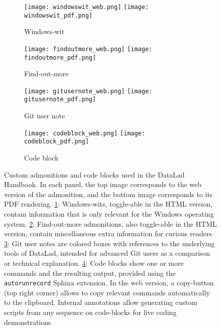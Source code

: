 \begin{figure}
	\hfill
	\begin{subfigure}{.44\textwidth}
	\texttt{[image: windowswit\_web.png]}
	\texttt{[image: windowswit\_pdf.png]}
	\caption{Windows-wit}
	\label{fig:handbook-windowswit}
	\end{subfigure}
	\begin{subfigure}{.55\textwidth}
		\texttt{[image: findoutmore\_web.png]}
		\texttt{[image: findoutmore\_pdf.png]}
		\caption{Find-out-more}
		\label{fig:handbook-findoutmore}
	\end{subfigure}
	\hfill
	\begin{subfigure}{.44\textwidth}
	\texttt{[image: gitusernote\_web.png]}
	\texttt{[image: gitusernote\_pdf.png]}
	\caption{Git user note}
	\label{fig:handbook-gitusernote}
	\end{subfigure}
	\hfill
	\begin{subfigure}{.55\textwidth}
	\texttt{[image: codeblock\_web.png]}
	\texttt{[image: codeblock\_pdf.png]}
	\caption{Code block}
	\label{fig:handbook-codeblock}
    \end{subfigure}
	\caption[Customization in the DataLad Handbook]{Custom admonitions and code blocks used in the DataLad Handbook. In each panel, the top image corresponds to the web version of the admonition, and the bottom image corresponds to its PDF rendering.
	\ref{fig:handbook-windowswit}: Windows-wits, toggle-able in the HTML version, contain information that is only relevant for the Windows operating system. \ref{fig:handbook-findoutmore}: Find-out-more admonitions, also toggle-able in the HTML version, contain miscellaneous extra information for curious readers. \ref{fig:handbook-gitusernote}: Git user notes are colored boxes with references to the underlying tools of DataLad, intended for advanced Git users as a comparison or technical explanation.  \ref{fig:handbook-codeblock}: Code blocks show one or more commands and the resulting output, provided using the \texttt{autorunrecord} Sphinx extension. In the web version, a copy-button (top right corner) allows to copy relevant commands automatically to the clipboard. Internal annotations allow generating custom scripts from any sequence on code-blocks for live coding demonstrations}
	\label{fig:handbook-admonitions}
\end{figure}

